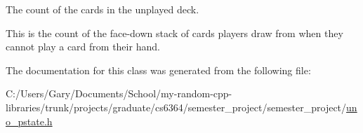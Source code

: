 \-The count of the cards in the unplayed deck. 

\-This is the count of the face-\/down stack of cards players draw from when they cannot play a card from their hand. 

\-The documentation for this class was generated from the following file\-:\begin{DoxyCompactItemize}
\item 
\-C\-:/\-Users/\-Gary/\-Documents/\-School/my-\/random-\/cpp-\/libraries/trunk/projects/graduate/cs6364/semester\-\_\-project/semester\-\_\-project/\hyperlink{uno__pstate_8h}{uno\-\_\-pstate.\-h}\end{DoxyCompactItemize}
